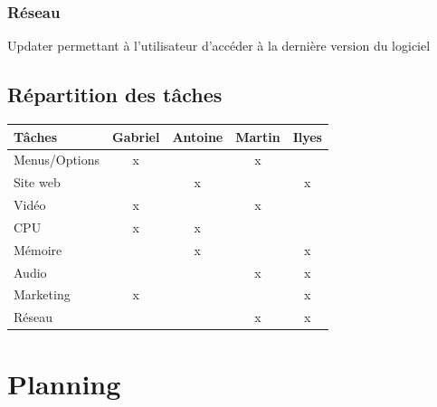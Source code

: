 \documentclass[12pt, a4paper]{article}
\begin{document}
\subsubsection{Réseau}
Updater permettant à l'utilisateur d'accéder à la dernière version du logiciel

\pagebreak

\subsection{Répartition des tâches}

\bigskip
\bigskip


\begin{center}
\begin{tabular}{|l|c|c|c|c|}
\hline
\bf Tâches                & \bf Gabriel   & \bf Antoine   & \bf Martin    & \bf Ilyes\\
\hline 
Menus/Options       &      x       &               &         x     &       \\
\hline 
Site web            &               &         x     &               &     x  \\
\hline 
Vidéo               &          x    &               &       x       &       \\
\hline 
CPU                 & x             & x             &               &       \\
\hline 
Mémoire             &               & x             &               &  x \\
\hline
Audio               &               &               & x             & x \\
\hline
Marketing           & x             &               &               & x \\
\hline
Réseau              &               &               & x             & x \\ 
\hline
\end{tabular}
\end{center}
\bigskip
\bigskip
\bigskip

\section{Planning}
\bigskip
\bigskip
\end{document}

